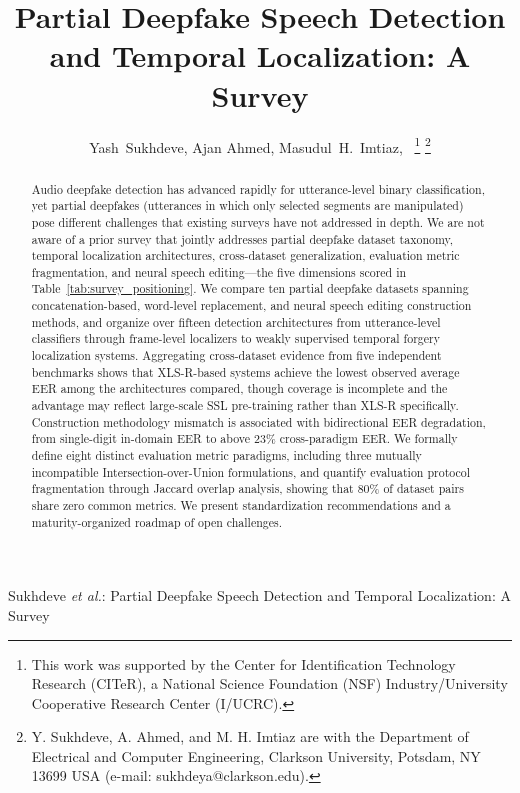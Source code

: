 \documentclass[journal]{IEEEtran}
\begin{document}
%
{Sukhdeve \MakeLowercase{\textit{et al.}}: Partial Deepfake Speech Detection and Temporal Localization: A Survey}

\title{Partial Deepfake Speech Detection and Temporal Localization: A Survey}

\author{Yash~Sukhdeve, Ajan Ahmed, Masudul~H.~Imtiaz,~%
\thanks{This work was supported by the Center for Identification Technology Research (CITeR), a National Science Foundation (NSF) Industry/University Cooperative Research Center (I/UCRC).}%
\thanks{Y. Sukhdeve, A. Ahmed, and M. H. Imtiaz are with the Department of Electrical and Computer Engineering, Clarkson University, Potsdam, NY 13699 USA (e-mail: sukhdeya@clarkson.edu).}}

\maketitle

\begin{abstract}
Audio deepfake detection has advanced rapidly for utterance-level binary classification, yet partial deepfakes (utterances in which only selected segments are manipulated) pose different challenges that existing surveys have not addressed in depth. We are not aware of a prior survey that jointly addresses partial deepfake dataset taxonomy, temporal localization architectures, cross-dataset generalization, evaluation metric fragmentation, and neural speech editing---the five dimensions scored in Table~\ref{tab:survey_positioning}. We compare ten partial deepfake datasets spanning concatenation-based, word-level replacement, and neural speech editing construction methods, and organize over fifteen detection architectures from utterance-level classifiers through frame-level localizers to weakly supervised temporal forgery localization systems. Aggregating cross-dataset evidence from five independent benchmarks shows that XLS-R-based systems achieve the lowest observed average EER among the architectures compared, though coverage is incomplete and the advantage may reflect large-scale SSL pre-training rather than XLS-R specifically. Construction methodology mismatch is associated with bidirectional EER degradation, from single-digit in-domain EER to above 23\% cross-paradigm EER. We formally define eight distinct evaluation metric paradigms, including three mutually incompatible Intersection-over-Union formulations, and quantify evaluation protocol fragmentation through Jaccard overlap analysis, showing that 80\% of dataset pairs share zero common metrics. We present standardization recommendations and a maturity-organized roadmap of open challenges.
\end{abstract}
\end{document}
